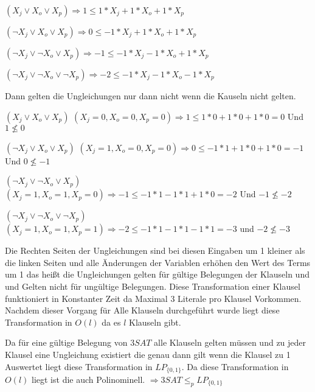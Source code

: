 \begin{list}{}{}
\item $(X_j \vee X_o \vee X_p) \Rightarrow 1 \leq 1*X_j+1* X_o + 1*X_p$
\item $( \neg X_j \vee X_o \vee X_p) \Rightarrow  0 \leq -1*X_j+1* X_o + 1*X_p$
\item $(\neg X_j \vee \neg X_o \vee X_p) \Rightarrow -1 \leq -1*X_j-1* X_o + 1*X_p$
\item $( \neg X_j \vee \neg X_o \vee \neg X_p) \Rightarrow -2 \leq -1*X_j-1* X_o - 1*X_p$
\end{list}
Dann gelten die Ungleichungen nur dann nicht wenn die Kauseln nicht gelten.
\begin{list}{}{}
\item[$(X_j \vee X_o \vee X_p)$] $(X_j=0, X_o=0, X_p=0) \Rightarrow 1 \leq 1*0+1* 0 + 1*0=0$ Und $1 \nleq 0$
\item[$( \neg X_j \vee X_o \vee X_p)$] $( X_j=1 , X_o=0, X_p=0) \Rightarrow  0 \leq -1*1+1* 0 + 1*0=-1$ Und $0 \nleq -1$
\item[$(\neg X_j \vee \neg X_o \vee X_p)$] $(X_j=1, X_o=1, X_p=0) \Rightarrow -1 \leq -1*1-1* 1 + 1*0=-2$ Und $-1 \nleq -2$
\item[$( \neg X_j \vee \neg X_o \vee \neg X_p)$] $( X_j=1, X_o=1,X_p=1) \Rightarrow -2 \leq -1*1-1* 1 - 1*1=-3$ und $-2 \nleq -3$
\end{list}
Die Rechten Seiten der Ungleichungen sind bei diesen Eingaben um 1 kleiner als die linken Seiten und alle Änderungen der Variablen erhöhen den Wert des Terms um 1 das heißt die Ungleichungen gelten für gültige Belegungen der Klauseln und und Gelten nicht für ungültige Belegungen. Diese Transformation einer Klausel funktioniert in Konstanter Zeit da Maximal 3 Literale pro Klausel Vorkommen. Nachdem dieser Vorgang für Alle Klauseln durchgeführt wurde liegt diese Transformation in $O(l)$ da es $l$ Klauseln gibt.

Da für eine gültige Belegung von $3SAT$ alle Klauseln gelten müssen und zu jeder Klausel eine Ungleichung existiert die genau dann gilt wenn die Klausel zu 1 Auswertet liegt diese Transformation in $LP_{\{ 0,1\} }$. Da diese Transformation in $O(l)$ liegt ist die auch Polinominell. $ \Rightarrow 3SAT \leq_p  LP_{\{ 0,1\} }$